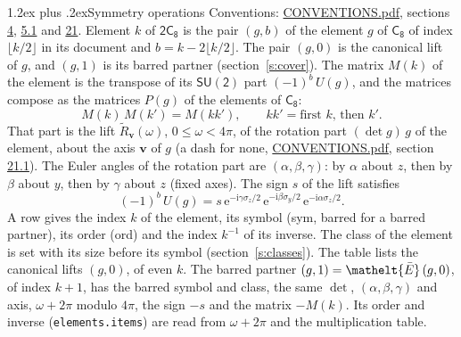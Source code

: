 \documentclass[10pt,a4paper]{article}
\makeatletter
\renewcommand\section{\@startsection{section}{1}{\z@}{-3ex plus -1ex minus -.2ex}%
  {1.2ex plus .2ex}{\normalfont\large\sffamily\bfseries\color{parttitle}}}
\numberwithin{equation}{section}
\newcommand{\eltfont}[1]{{\let\sigma\eltsigma\mathelt{#1}}}
\newcommand{\grp}[1]{\mathsf{#1}}
\newcommand{\elt}[1]{\eltfont{#1}}
\newcommand{\vv}{\mathbf{v}}
\newcommand{\iunit}{\mathrm{i}}
\newcommand{\expe}{\mathrm{e}}
\newcommand{\barred}[1]{\bar{#1}}
\newcommand{\lift}[1]{\tilde{#1}}
\newcommand{\pauli}[1]{\sigma_{#1}}
\makeatother
\begin{document}
\section{Symmetry operations}\label{s:elements}
Conventions: \href{../../CONVENTIONS.pdf}{CONVENTIONS.pdf}, sections \href{../../../rotation/CONVENTIONS.pdf\#conv.4}{4}, \href{../../../rotation/CONVENTIONS.pdf\#conv.5.1}{5.1} and \href{../../CONVENTIONS.pdf\#conv.21}{21}.
\leavevmode\label{n:index.element}\label{n:element.g}Element $k$ of $\grp{2C_{8}}$ is the pair $(g, b)$ of the element $g$ of \href{../../../rotation/data/pdf/C8.pdf}{$\grp{C_{8}}$} of index $\lfloor k/2\rfloor$ in its document and $b = k - 2\lfloor k/2\rfloor$. The pair $(g, 0)$ is the canonical lift of $g$, and $(g, 1)$ is its barred partner (section~\ref{s:cover}). \label{n:matrix.element.pin}\label{n:matrix.element}The matrix $M(k)$ of the element is the transpose of its $\grp{SU(2)}$ part $(-1)^{b}\,U(g)$, and the matrices compose as the matrices $P(g)$ of the elements of $\grp{C_{8}}$:
\begin{equation}\label{e:mprod}M(k)\,M(k') = M(kk'),\qquad kk' = \text{first } k\text{, then } k'.\end{equation}
\leavevmode\label{n:angle.omega}\label{n:vector.axis}\label{n:vector.pole}That part is the lift $\lift{R}_{\vv}(\omega)$, $0 \le \omega < 4\pi$, of the rotation part $(\det g)\,g$ of the element, about the axis $\vv$ of $g$ (a dash for none, \href{../../CONVENTIONS.pdf}{CONVENTIONS.pdf}, section \href{../../CONVENTIONS.pdf\#conv.21.1}{21.1}). \label{n:angle.euler.alpha}\label{n:angle.euler.beta}\label{n:angle.euler.gamma}\label{n:vector.coordinates}The Euler angles of the rotation part are $(\alpha,\beta,\gamma)$: by $\alpha$ about $z$, then by $\beta$ about $y$, then by $\gamma$ about $z$ (fixed axes). \label{n:local.euler.sign}The sign $s$ of the lift satisfies
\begin{equation}\label{e:euler}(-1)^{b}\,U(g) = s\,\expe^{-\iunit\gamma\pauli{z}/2}\,\expe^{-\iunit\beta\pauli{y}/2}\,\expe^{-\iunit\alpha\pauli{z}/2}.\end{equation}
\leavevmode\label{n:index.element.inverse}\label{n:head.sym}\label{n:head.ord}A row gives the index $k$ of the element, its symbol (sym, barred for a barred partner), its order (ord) and the index $k^{-1}$ of its inverse. \label{n:head.class}The class of the element is set with its size before its symbol (section~\ref{s:classes}).
The table lists the canonical lifts $(g, 0)$, of even $k$. The barred partner $(g, 1) = \elt{\barred{E}}\,(g, 0)$, of index $k + 1$, has the barred symbol and class, the same $\det$, $(\alpha,\beta,\gamma)$ and axis, $\omega + 2\pi$ modulo $4\pi$, the sign $-s$ and the matrix $-M(k)$. Its order and inverse (\texttt{elements.items}) are read from $\omega + 2\pi$ and the multiplication table.
\end{document}
